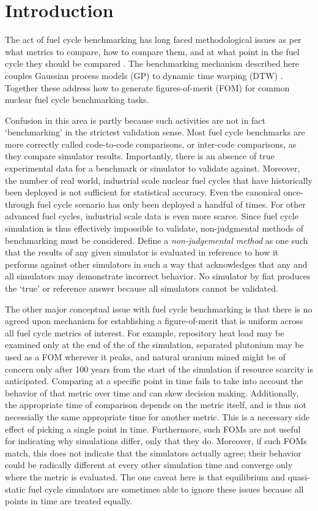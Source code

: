\section{Introduction}
\label{intro}
The act of fuel cycle benchmarking has long faced methodological issues 
as per what metrics to compare, how to compare them, and at what point in the
fuel cycle they should be compared 
\cite{wilson2011comparing,guerin2009benchmark,piet2011assessment}. 
The benchmarking mechanism described 
here couples Gaussian process models (GP) \cite{rasmussen2006gaussian} to 
dynamic time warping (DTW) \cite{muller}. Together these address how to 
generate figures-of-merit (FOM) for common nuclear fuel cycle benchmarking
tasks. 

Confusion in this area is partly because such activities 
are not in fact `benchmarking' in the strictest validation sense. Most fuel
cycle benchmarks are more correctly called code-to-code comparisons, or 
inter-code comparisons, as they compare simulator results. Importantly, 
there is an absence of true experimental data for a benchmark or simulator
to validate against. Moreover, the number of 
real world, industrial scale nuclear fuel cycles that have historically been 
deployed is not sufficient for statistical accuracy. Even the canonical 
once-through fuel cycle scenario has only been deployed a handful of times.
For other advanced fuel cycles, industrial scale data is even more scarce. 
Since fuel cycle simulation is thus effectively impossible to validate, 
non-judgmental methods of benchmarking must be considered. 
Define a \emph{non-judgemental method} as one such that the 
results of any given simulator is evaluated in reference to how 
it performs against other simulators in such a way that acknowledges that 
any and all simulators may demonstrate incorrect behavior. No simulator
by fiat produces the `true' or reference answer because all simulators 
cannot be validated.

The other major conceptual issue with fuel cycle benchmarking is that there 
is no agreed upon mechanism for establishing a figure-of-merit
that is uniform across all fuel cycle metrics of interest. For example, 
repository heat load may be examined only at the end of the of the simulation,
separated plutonium may be used as a FOM wherever it peaks, and natural uranium 
mined might be of concern only after 100 years from the start of the 
simulation if resource scarcity is anticipated. Comparing at a specific point 
in time fails to take into account the behavior of that metric over time and 
can skew decision making. Additionally, the appropriate 
time of comparison depends on the metric itself, and is thus not necessially 
the same appropriate time for another metric. This is a necessary 
side effect of picking a single point in time.
Furthermore, such FOMs are not useful for indicating why simulations differ, 
only that they do. Moreover, if such FOMs match, this does not indicate
that the simulators actually agree; their behavior 
could be radically different at every other simulation time and converge
only where the metric is evaluated.  The one caveat 
here is that 
equilibrium and quasi-static fuel cycle simulators are sometimes able to 
ignore these issues because all points in time are treated equally.

